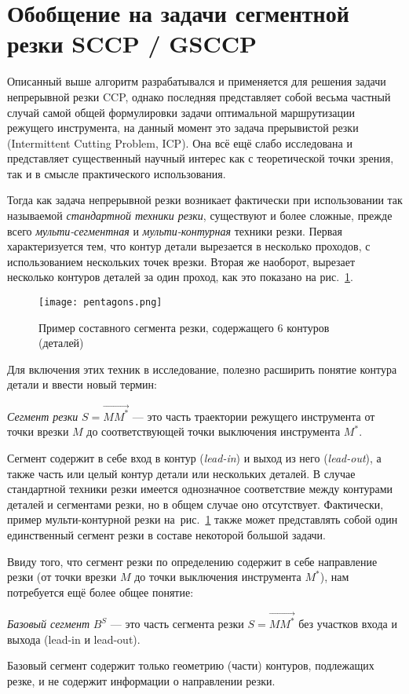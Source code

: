 
\section{Обобщение на задачи сегментной резки SCCP / GSCCP}
\label{sec:ccp.gsccp}

Описанный выше алгоритм разрабатывался и применяется
для решения задачи непрерывной резки CCP,
однако последняя представляет собой весьма
частный случай самой общей формулировки
задачи оптимальной маршрутизации режущего инструмента,
на данный момент это задача прерывистой резки
(Intermittent Cutting Problem, ICP).
Она всё ещё слабо исследована
и представляет существенный научный интерес
как с теоретической точки зрения,
так и в смысле практического использования.

Тогда как задача непрерывной резки возникает фактически
при использовании так называемой
\textit{стандартной техники резки},
существуют и более сложные,
прежде всего
\textit{мульти-сегментная}
и
\textit{мульти-контурная}
техники резки.
Первая характеризуется тем,
что контур детали вырезается в несколько проходов,
с использованием нескольких точек врезки.
Вторая же наоборот, вырезает несколько контуров деталей
за один проход,
как это показано на рис.~\ref{fig:ccp-6x5}.

\begin{figure}
  \centering
  \texttt{[image: pentagons.png]}
  \caption{Пример составного сегмента резки, содержащего 6 контуров (деталей)}
  \label{fig:ccp-6x5}
\end{figure}

Для включения этих техник в исследование,
полезно расширить понятие контура детали и ввести новый термин:

\textit{Сегмент резки}
$S = \overrightarrow{M M^*}$
--- это часть траектории режущего инструмента от точки врезки $M$
до соответствующей точки выключения инструмента $M^*$.

Сегмент содержит в себе вход в контур
(\textit{lead-in})
и выход из него
(\textit{lead-out}),
а также часть или целый контур детали
или нескольких деталей.
В случае стандартной техники резки
имеется однозначное соответствие между
контурами деталей и сегментами резки,
но в общем случае оно отсутствует.
Фактически, пример мульти-контурной резки на~рис.~\ref{fig:ccp-6x5}
также может представлять собой один единственный
сегмент резки в составе некоторой большой задачи.

Ввиду того,
что сегмент резки по определению содержит в себе
направление резки
(от точки врезки $M$ до точки выключения инструмента $M^*$),
нам потребуется ещё более общее понятие:

\textit{Базовый сегмент}
$B^S$
---
это часть сегмента резки
$S = \overrightarrow{M M^*}$
без участков входа и выхода
(lead-in и lead-out).

Базовый сегмент содержит только геометрию
(части) контуров, подлежащих резке,
и не содержит информации о направлении резки.
